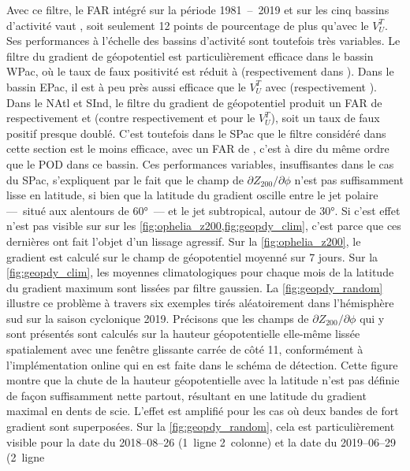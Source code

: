 \documentclass[../main.tex]{subfiles}
\begin{document}
Avec ce filtre, le FAR intégré sur la période \num{1981}~--~\num{2019} et sur les cinq bassins d'activité vaut , soit seulement 12 points de
pourcentage de plus qu'avec le $V_U^T$. Ses performances à l'échelle des bassins d'activité sont toutefois très variables. Le filtre du gradient de géopotentiel
est particulièrement efficace dans le bassin WPac, où le taux de faux positivité est réduit à  (respectivement  dans
\cite{dulac_assessing_2023}). Dans le bassin EPac, il est à peu près aussi efficace que le $V_U^T$ avec  (respectivement ). Dans le NAtl et
SInd, le filtre du gradient de géopotentiel produit un FAR de respectivement  et  (contre respectivement  et  pour le
$V_U^T$), soit un taux de faux positif presque doublé. C'est toutefois dans le SPac que le filtre considéré dans cette section est le moins efficace, avec un
FAR de , c'est à dire du même ordre que le POD dans ce bassin. Ces performances variables, insuffisantes dans le cas du SPac, s'expliquent par le fait
que le champ de $\partial Z_{200} / \partial \phi$ n'est pas suffisamment lisse en latitude, si bien que la latitude du gradient oscille entre le jet polaire
---~situé aux alentours de \ang{60}~--- et le jet subtropical, autour de \ang{30}. Si c'est effet n'est pas visible sur sur les
\cref{fig:ophelia_z200,fig:geopdy_clim}, c'est parce que ces dernières ont fait l'objet d'un lissage agressif. Sur la \cref{fig:ophelia_z200}, le gradient est
calculé sur le champ de géopotentiel moyenné sur \num{7} jours. Sur la \cref{fig:geopdy_clim}, les moyennes climatologiques pour chaque mois de la latitude du
gradient maximum sont lissées par filtre gaussien. La \cref{fig:geopdy_random} illustre ce problème à travers six exemples tirés aléatoirement dans l'hémisphère
sud sur la saison cyclonique 2019. Précisons que les champs de $\partial Z_{200} / \partial \phi$ qui y sont présentés sont calculés sur la hauteur
géopotentielle elle-même lissée spatialement avec une fenêtre glissante carrée de côté 11, conformément à l'implémentation online qui en est faite dans le
schéma de détection. Cette figure montre que la chute de la hauteur géopotentielle avec la latitude n'est pas définie de façon suffisamment nette partout,
résultant en une latitude du gradient maximal en dents de scie. L'effet est amplifié pour les cas où deux bandes de fort gradient sont superposées. Sur la
\cref{fig:geopdy_random}, cela est particulièrement visible pour la date du 2018--08--26 (1\iere~ligne 2\ieme~colonne) et la date du 2019--06--29 (2\ieme~ligne
\end{document}
